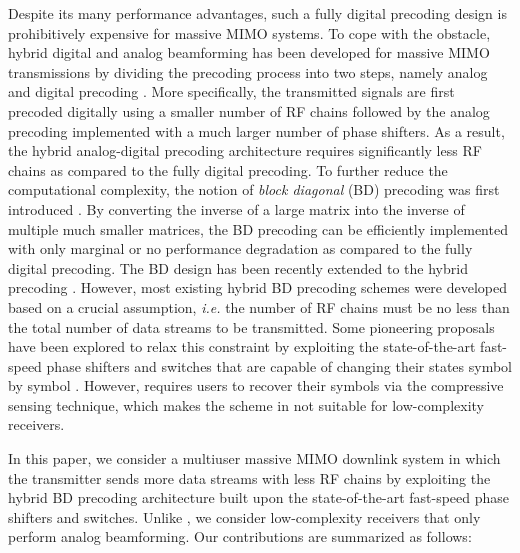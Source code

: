 \documentclass[conference]{IEEEtran}
\begin{document}
Despite its many performance advantages, such a fully digital precoding design is prohibitively expensive for massive MIMO systems. To cope with the obstacle, hybrid digital and analog beamforming has been developed for massive MIMO transmissions by dividing the precoding process into two steps, namely analog and digital precoding \cite{alkhateeb2014channel}. More specifically, the transmitted signals are first precoded digitally using a smaller number of RF chains followed by the analog precoding implemented with a much larger number of phase shifters. As a result, the hybrid analog-digital precoding architecture requires significantly less RF chains as compared to the fully digital precoding. To further reduce the computational complexity, the notion of \textit{block diagonal} (BD) precoding was first introduced \cite{spencer2004zero}. By converting the inverse of a large matrix into the inverse of  multiple much smaller matrices, the BD precoding can be efficiently implemented with only marginal or no performance degradation as compared to the fully digital precoding\cite{spencer2004zero}. The BD design has been recently extended to the hybrid precoding \cite{liu2014phase}. However, most existing hybrid BD precoding schemes were developed based on a crucial assumption, {\em i.e.} the number of RF chains must be no less than the total number of data streams to be transmitted. Some pioneering proposals have been explored to relax this constraint by exploiting the state-of-the-art fast-speed phase shifters and switches that are capable of changing their states symbol by symbol \cite{garcia2017mimo}. However, \cite{garcia2017mimo} requires users to recover their symbols via the compressive sensing technique, which makes the scheme in \cite{garcia2017mimo} not suitable for low-complexity receivers.

In this paper, we consider a multiuser massive MIMO downlink system in which the transmitter sends more data streams with less RF chains by exploiting the hybrid BD precoding architecture built upon the state-of-the-art fast-speed phase shifters and switches. Unlike \cite{garcia2017mimo}, we consider low-complexity receivers that only perform analog beamforming. Our contributions are summarized as follows:
\end{document}
